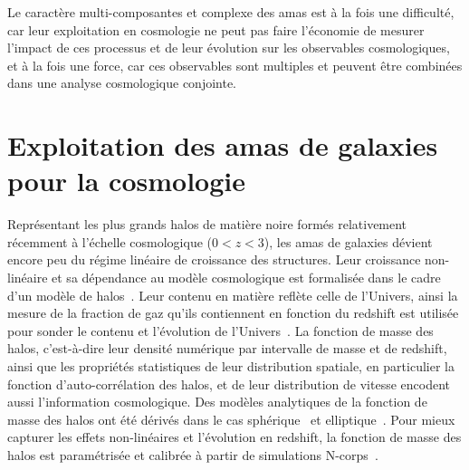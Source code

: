 Le caractère multi-composantes et complexe des amas est à la fois une
difficulté, car leur exploitation en cosmologie ne peut pas faire
l'économie de mesurer l'impact de ces processus et de leur évolution
sur les observables cosmologiques, et à la fois une force, car ces
observables sont multiples et peuvent être combinées dans une analyse
cosmologique conjointe.

\section{Exploitation des amas de galaxies pour la cosmologie}
\label{se:sondecosmo}

Représentant les plus grands halos de matière noire formés
relativement récemment à l'échelle cosmologique ($0<z<3$), les amas de
galaxies dévient encore peu du régime linéaire de croissance des structures.
Leur croissance non-linéaire et sa dépendance au modèle cosmologique
est formalisée dans le cadre d'un modèle de halos~\citep[pour une
revue voir][par exemple]{Cooray2002}. Leur contenu en matière reflète
celle de l'Univers, ainsi la mesure de la fraction de gaz qu'ils
contiennent en fonction du redshift est utilisée pour sonder le
contenu et l'évolution de
l'Univers~\citep[\emph{e.g.}][]{Allen2008,Ettori2009}. La
fonction de masse des halos, c'est-à-dire leur densité numérique par
intervalle de masse et de redshift, ainsi que les propriétés statistiques de leur
distribution spatiale, en particulier la fonction d'auto-corrélation
des halos, et de leur distribution de vitesse encodent aussi
l'information cosmologique. Des modèles analytiques de la fonction de
masse des halos ont été dérivés dans le cas sphérique~\citep{Press-Schechter1974}
et elliptique~\citep{Sheth2001}. Pour mieux capturer les effets
non-linéaires et l'évolution en redshift, la fonction de masse des
halos est paramétrisée et calibrée à partir de simulations
N-corps~\citep[][par exemple]{Eke1996, Tinker2008}.


